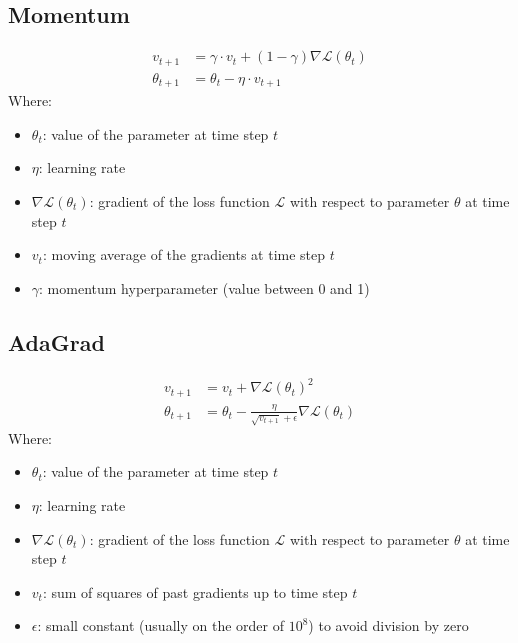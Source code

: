 \documentclass[a4paper]{article}
\newcommand{\ELL}{\mathcal{L}}
\begin{document}
\subsection*{Momentum}
\begin{align*}
    v_{t+1}      &= \gamma \cdot v_t + (1-\gamma) \nabla\ELL(\theta_t) \\
    \theta_{t+1} &= \theta_t - \eta \cdot v_{t+1}
\end{align*}
Where:
\begin{itemize}
    \item $\theta_t$: value of the parameter at time step $t$
    \item $\eta$: learning rate
    \item $\nabla\ELL(\theta_t)$: gradient of the loss function $\ELL$ with respect to parameter $\theta$ at time step $t$
    \item $v_t$: moving average of the gradients at time step $t$
    \item $\gamma$: momentum hyperparameter (value between 0 and 1)
\end{itemize}

\subsection*{AdaGrad}
\begin{align*}
    v_{t+1} &= v_t + \nabla\ELL(\theta_t)^2 \\
    \theta_{t+1} &= \theta_t - \frac{\eta}{\sqrt{v_{t+1}}+\epsilon} \nabla\ELL(\theta_t)
\end{align*}
Where:
\begin{itemize}
    \item $\theta_t$: value of the parameter at time step $t$
    \item $\eta$: learning rate
    \item $\nabla\ELL(\theta_t)$: gradient of the loss function $\ELL$ with respect to parameter $\theta$ at time step $t$
    \item $v_t$: sum of squares of past gradients up to time step $t$
    \item $\epsilon$: small constant (usually on the order of $10^8$) to avoid division by zero
\end{itemize}
\end{document}
